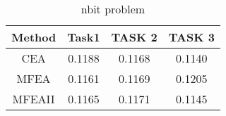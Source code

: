 \begin{table}
    \begin{center}
    \begin{tabular}{|c|c|c|c|}
    \hline
    \multirow{1}{*}{\textbf{Method}} & \multicolumn{1}{c|}{\textbf{Task1}} & \multicolumn{1}{c|}{\textbf{TASK 2}} & \multicolumn{1}{c|}{\textbf{TASK 3}} \\ \hline
    CEA & 0.1188 & 0.1168 & 0.1140 \\ \hline
    MFEA & 0.1161 & 0.1169 & 0.1205 \\ \hline
    MFEAII & 0.1165 & 0.1171 & 0.1145 \\ \hline
        
    \end{tabular}
    \end{center}
    \caption{nbit problem}
    \label{tab:result:nbit}
\end{table}
